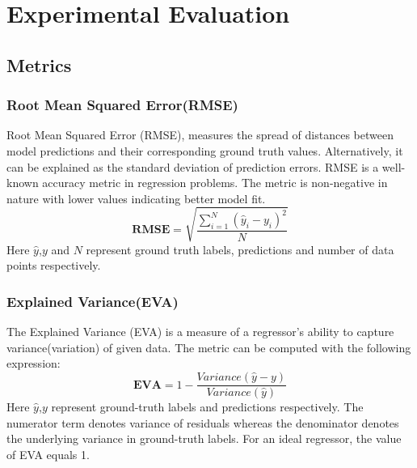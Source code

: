 

    \chapter{Experimental Evaluation}\label{chap_exp_eval}
\section{Metrics}
\subsection{Root Mean Squared Error(RMSE)}
Root Mean Squared Error (RMSE), measures the spread of distances between model predictions and their corresponding ground truth values. Alternatively, it can be explained as the standard deviation of prediction errors. RMSE is a well-known accuracy metric in regression problems. The metric is non-negative in nature with lower values indicating better model fit.
\begin{equation}
	\mathbf{RMSE} = \sqrt{\frac{\sum_{i=1}^{N}(\hat{y}_i-y_i)^2}{N}}
\end{equation}
Here $\hat{y}$,$y$ and $N$ represent ground truth labels, predictions and number of data points respectively.
\subsection{Explained Variance(EVA)}
The Explained Variance (EVA) is a measure of a regressor's ability to capture variance(variation) of given data. The metric can be computed with the following expression:
\begin{equation}
	\mathbf{EVA} = 1-\frac{Variance(\hat{y}-y)}{Variance(\hat{y})}
\end{equation}
Here $\hat{y}$,$y$ represent ground-truth labels and predictions respectively. The numerator term denotes variance of residuals whereas the denominator denotes the underlying variance in ground-truth labels. For an ideal regressor, the value of EVA equals 1.
